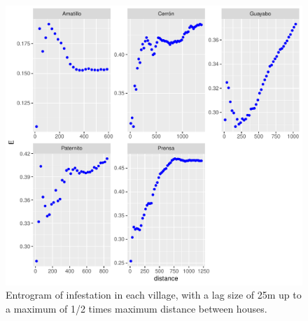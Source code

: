 \documentclass{scrartcl}
\begin{document}
\begin{figure}
  \centering
  \includegraphics[width=.7\linewidth]{entrogram}
  \caption{Entrogram of infestation in each village, with a lag size
    of 25m up to a maximum of 1/2 times maximum distance between
    houses.}
  \label{fig:entrogram}
\end{figure}
\end{document}
